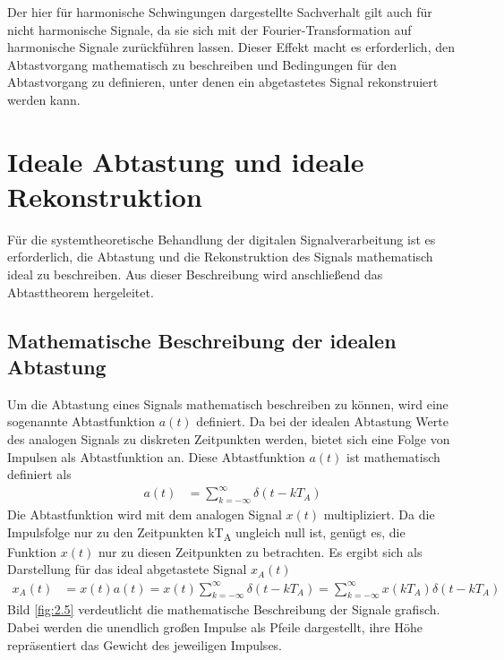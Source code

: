 Der hier für harmonische Schwingungen dargestellte Sachverhalt gilt auch für nicht harmonische Signale, da sie sich mit der Fourier-Transformation auf harmonische Signale zurückführen lassen. Dieser Effekt macht es erforderlich, den Abtastvorgang mathematisch zu beschreiben und Bedingungen für den Abtastvorgang zu definieren, unter denen ein abgetastetes Signal rekonstruiert werden kann.

\section{Ideale Abtastung und ideale Rekonstruktion}\label{sec:2.3}

Für die systemtheoretische Behandlung der digitalen Signalverarbeitung ist es erforderlich, die Abtastung und die Rekonstruktion des Signals mathematisch ideal zu beschreiben. Aus dieser Beschreibung wird anschließend das Abtasttheorem hergeleitet.

\subsection{Mathematische Beschreibung der idealen Abtastung}\label{sec:mathematische-beschreibung-der-idealen-abtastung}

Um die Abtastung eines Signals mathematisch beschreiben zu können, wird eine sogenannte Abtastfunktion \(a(t)\) definiert. Da bei der idealen Abtastung Werte des analogen Signals zu diskreten Zeitpunkten werden, bietet sich eine Folge von Impulsen als Abtastfunktion an. Diese Abtastfunktion \(a(t)\) ist mathematisch definiert als
\begin{align}
a(t) &= \sum\limits_{k = - \infty}^{\infty}{\delta\left( t - k  T_{A} \right)} \label{eq:2.6}
\end{align}
Die Abtastfunktion wird mit dem analogen Signal \(x(t)\) multipliziert. Da die Impulsfolge nur zu den Zeitpunkten kT\textsubscript{A} ungleich null ist, genügt es, die Funktion \(x(t)\) nur zu diesen Zeitpunkten zu betrachten. Es ergibt sich als Darstellung für das ideal abgetastete Signal \(x_{A}(t)\)
\begin{align}
x_{A}(t) &= x(t)  a(t) = x(t)  \sum\limits_{k = - \infty}^{\infty}{\delta\left( t - k  T_{A} \right)} = \sum\limits_{k = - \infty}^{\infty}{x\left( k  T_{A} \right)  \delta\left( t - k  T_{A} \right)} \label{eq:2.7}
\end{align}
Bild \ref{fig:2.5} verdeutlicht die mathematische Beschreibung der Signale grafisch. Dabei werden die unendlich großen Impulse als Pfeile dargestellt, ihre Höhe repräsentiert das Gewicht des jeweiligen Impulses.

